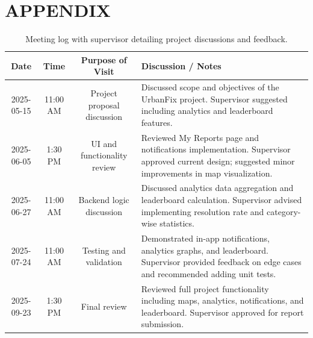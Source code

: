 \section*{\Large\centering \textbf{APPENDIX}}

\begin{table}[h!]
    \centering
    \caption{Meeting log with supervisor detailing project discussions and feedback.}
    \begin{tabularx}{\textwidth}{|c|c|c|X|}
        \hline
        \textbf{Date} & \textbf{Time} & \textbf{Purpose of Visit}   & \textbf{Discussion / Notes}                                                                                                                         \\
        \hline
        2025-05-15    & 11:00 AM      & Project proposal discussion & Discussed scope and objectives of the UrbanFix project. Supervisor suggested including analytics and leaderboard features.                          \\
        \hline
        2025-06-05    & 1:30 PM       & UI and functionality review & Reviewed My Reports page and notifications implementation. Supervisor approved current design; suggested minor improvements in map visualization.   \\
        \hline
        2025-06-27    & 11:00 AM      & Backend logic discussion    & Discussed analytics data aggregation and leaderboard calculation. Supervisor advised implementing resolution rate and category-wise statistics.     \\
        \hline
        2025-07-24    & 11:00 AM      & Testing and validation      & Demonstrated in-app notifications, analytics graphs, and leaderboard. Supervisor provided feedback on edge cases and recommended adding unit tests. \\
        \hline
        2025-09-23    & 1:30 PM       & Final review                & Reviewed full project functionality including maps, analytics, notifications, and leaderboard. Supervisor approved for report submission.           \\
        \hline
    \end{tabularx}
\end{table}

